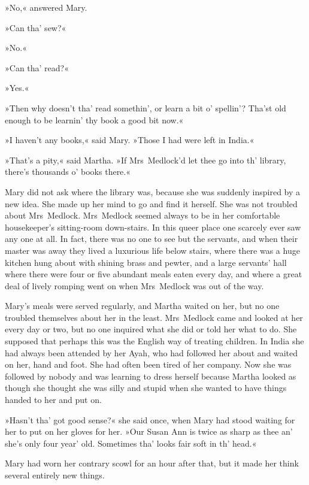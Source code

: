»No,« answered Mary.

»Can tha' sew?«

»No.«

»Can tha' read?«

»Yes.«

»Then why doesn't tha' read somethin', or learn a bit o' spellin'? Tha'st old enough to be learnin' thy book a good bit now.«

»I haven't any books,« said Mary. »Those I had were left in India.«

»That's a pity,« said Martha. »If Mrs~Medlock'd let thee go into th' library, there's thousands o' books there.«

Mary did not ask where the library was, because she was suddenly inspired by a new idea. She made up her mind to go and find it herself. She was not troubled about Mrs~Medlock. Mrs~Medlock seemed always to be in her comfortable housekeeper's sitting-room down-stairs. In this queer place one scarcely ever saw any one at all. In fact, there was no one to see but the servants, and when their master was away they lived a luxurious life below stairs, where there was a huge kitchen hung about with shining brass and pewter, and a large servants' hall where there were four or five abundant meals eaten every day, and where a great deal of lively romping went on when Mrs~Medlock was out of the way.

Mary's meals were served regularly, and Martha waited on her, but no one troubled themselves about her in the least. Mrs~Medlock came and looked at her every day or two, but no one inquired what she did or told her what to do. She supposed that perhaps this was the English way of treating children. In India she had always been attended by her Ayah, who had followed her about and waited on her, hand and foot. She had often been tired of her company. Now she was followed by nobody and was learning to dress herself because Martha looked as though she thought she was silly and stupid when she wanted to have things handed to her and put on.

»Hasn't tha' got good sense?« she said once, when Mary had stood waiting for her to put on her gloves for her. »Our Susan Ann is twice as sharp as thee an' she's only four year' old. Sometimes tha' looks fair soft in th' head.«

Mary had worn her contrary scowl for an hour after that, but it made her think several entirely new things.

